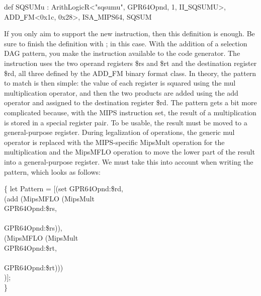 \begin{tcolorbox}[colback=white,colframe=black]
def SQSUMu : ArithLogicR<"sqsumu", GPR64Opnd, 1, II\underline{~}SQSUMU>, \\
\hspace*{4cm}ADD\underline{~}FM<0x1c, 0x28>, ISA\underline{~}MIPS64, SQSUM
\end{tcolorbox}

If you only aim to support the new instruction, then this definition is enough. Be sure to finish the definition with ; in this case. With the addition of a selection DAG pattern, you make the instruction available to the code generator. The instruction uses the two operand registers \$rs and \$rt and the destination register \$rd, all three defined by the ADD\underline{~}FM binary format class. In theory, the pattern to match is then simple: the value of each register is squared using the mul multiplication operator, and then the two products are added using the add operator and assigned to the destination register \$rd. The pattern gets a bit more complicated because, with the MIPS instruction set, the result of a multiplication is stored in a special register pair. To be usable, the result must be moved to a general-purpose register. During legalization of operations, the generic mul operator is replaced with the MIPS-specific MipsMult operation for the multiplication and the MipsMFLO operation to move the lower part of the result into a general-purpose register. We must take this into account when writing the pattern, which looks as follows:\par

\begin{tcolorbox}[colback=white,colframe=black]
\{
\hspace*{0.5cm}let Pattern = [(set GPR64Opnd:\$rd, \\
\hspace*{4cm}(add (MipsMFLO (MipsMult \\
\hspace*{4.5cm}GPR64Opnd:\$rs, \\
\\
\hspace*{4.5cm}GPR64Opnd:\$rs)), \\
\hspace*{5.5cm}(MipsMFLO (MipsMult \\
\hspace*{6cm}GPR64Opnd:\$rt, \\
\\
\hspace*{6cm}GPR64Opnd:\$rt))) \\
\hspace*{4.5cm})];\\
\}
\end{tcolorbox}

